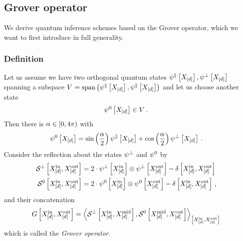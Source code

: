 \subsection{Grover operator}\label{sec:groverOperator}

We derive quantum inference schemes based on the Grover operator, which we want to first introduce in full generality.

\subsubsection{Definition}

Let us assume we have two orthogonal quantum states $\psi^{\parallel}\left[X_{[d]}\right],\psi^{\perp}\left[X_{[d]}\right]$ spanning a subspace $V^{}=\mathrm{span}\left(\psi^{\parallel}\left[X_{[d]}\right],\psi^{\parallel}\left[X_{[d]}\right]\right)$ and let us choose another state
\begin{align*}
    \psi^{0}\left[X_{[d]}\right]
    \in V^{}\, .
\end{align*}
Then there is $\alpha\in[0,4\pi)$ with
\begin{align*}
    \psi^{0}\left[X_{[d]}\right]
    = \mathrm{sin}\left(\frac{\alpha}{2}\right)\psi^{\parallel}\left[X_{[d]}\right]
    + \mathrm{cos}\left(\frac{\alpha}{2}\right)\psi^{\perp}\left[X_{[d]}\right] \, .
\end{align*}
Consider the reflection about the states $\psi^{\perp}$ and $\psi^{0}$ by
\begin{align*}
    \mathcal{S}^{\perp}\left[X_{[d]}^{\mathrm{in}},X_{[d]}^{\mathrm{out}}\right]
    &= 2 \cdot \psi^{\perp}\left[X_{[d]}^{\mathrm{in}}\right] \otimes \psi^{\perp}\left[X_{[d]}^{\mathrm{out}}\right] - \delta\left[X_{[d]}^{\mathrm{in}},X_{[d]}^{\mathrm{out}}\right] \\
    \mathcal{S}^{0}\left[X_{[d]}^{\mathrm{in}},X_{[d]}^{\mathrm{out}}\right]
    &= 2 \cdot \psi^{0}\left[X_{[d]}^{\mathrm{in}}\right] \otimes \psi^{0}\left[X_{[d]}^{\mathrm{out}}\right] - \delta\left[X_{[d]}^{\mathrm{in}},X_{[d]}^{\mathrm{out}}\right] \, ,
\end{align*}
and their concatenation
\begin{align*}
    G\left[X_{[d]}^{\mathrm{in}},X_{[d]}^{\mathrm{out}}\right]
    = \left\langle 
        \mathcal{S}^{\perp}\left[X_{[d]}^{\mathrm{in}},X_{[d]}^{\mathrm{mid}}\right],
        \mathcal{S}^{0}\left[X_{[d]}^{\mathrm{mid}},X_{[d]}^{\mathrm{out}}\right]
    \right\rangle_{\left[ X_{[d]}^{\mathrm{in}},X_{[d]}^{\mathrm{out}} \right]}
\end{align*}
which is called the \emph{Grover operator}.

